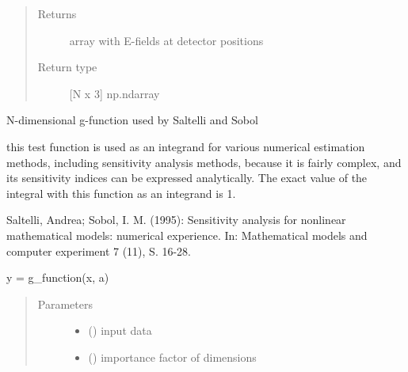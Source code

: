 \documentclass[letterpaper,10pt,english,openany,oneside]{sphinxmanual}
\begin{document}
\begin{fulllineitems}
\begin{quote}
\begin{description}
\begin{itemize}
\end{itemize}

\item[{Returns}] \leavevmode
{} \textendash{} array with E-fields at detector positions

\item[{Return type}] \leavevmode
{[}N x 3{]} np.ndarray

\end{description}\end{quote}

\end{fulllineitems}


\begin{fulllineitems}
\label{\detokenize{pygpc:pygpc.testfun.g_function}}
N-dimensional g-function used by Saltelli and Sobol

this test function is used as an integrand for various numerical
estimation methods, including sensitivity analysis methods, because it
is fairly complex, and its sensitivity indices can be expressed
analytically. The exact value of the integral with this function as an
integrand is 1.

Saltelli, Andrea; Sobol, I. M. (1995): Sensitivity analysis for nonlinear
mathematical models: numerical experience. In: Mathematical models and
computer experiment 7 (11), S. 16-28.

y = g\_function(x, a)
\begin{quote}\begin{description}
\item[{Parameters}] \leavevmode\begin{itemize}
\item {} 
 (\sphinxstyleliteralemphasis{\sphinxupquote{{[}}}\sphinxstyleliteralemphasis{\sphinxupquote{{]} }}) \textendash{} input data

\item {} 
 (\sphinxstyleliteralemphasis{\sphinxupquote{{[}}}\sphinxstyleliteralemphasis{\sphinxupquote{{]} }}) \textendash{} importance factor of dimensions


\end{itemize}
\end{description}
\end{quote}
\end{fulllineitems}
\end{document}
